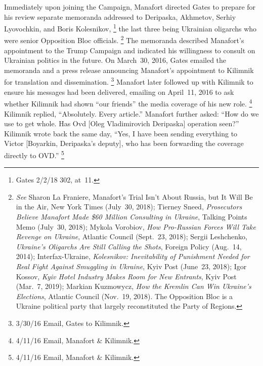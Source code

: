 Immediately upon joining the Campaign, Manafort directed Gates to prepare for his review separate memoranda addressed to Deripaska, Akhmetov, Serhiy Lyovochkin, and Boris Kolesnikov,%
\footnote{Gates 2/2/18 302, at~11.}
the last three being Ukrainian oligarchs who were senior Opposition Bloc officials.%
\footnote{\textit{See} Sharon La Franiere, Manafort's Trial Isn't About Russia, but It Will Be in the Air, New York Times (July~30, 2018);
Tierney Sneed, \textit{Prosecutors Believe Manafort Made \$60 Million Consulting in Ukraine}, Talking Points Memo (July~30, 2018);
Mykola Vorobiov, \textit{How Pro-Russian Forces Will Take Revenge on Ukraine}, Atlantic Council (Sept.~23, 2018);
Sergii Leshchenko, \textit{Ukraine's Oligarchs Are Still Calling the Shots}, Foreign Policy (Aug.~14, 2014);
Interfax-Ukraine, \textit{Kolesnikov: Inevitability of Punishment Needed for Real Fight Against Smuggling in Ukraine}, Kyiv Post (June~23, 2018);
Igor Kossov, \textit{Kyiv Hotel Industry Makes Room for New Entrants}, Kyiv Post (Mar.~7, 2019);
Markian Kuzmowycz, \textit{How the Kremlin Can Win Ukraine's Elections}, Atlantic Council (Nov.~19, 2018).
The Opposition Bloc is a Ukraine political party that largely reconstituted the Party of Regions.
}
The memoranda described Manafort's appointment to the Trump Campaign and indicated his willingness to consult on Ukrainian politics in the future.
On March~30, 2016, Gates emailed the memoranda and a press release announcing Manafort's appointment to Kilimnik for translation and dissemination.%
\footnote{3/30/16 Email, Gates to Kilimnik.}
Manafort later followed up with Kilimnik to ensure his messages had been delivered, emailing on April~11, 2016 to ask whether Kilimnik had shown ``our friends'' the media coverage of his new role.%
\footnote{4/11/16 Email, Manafort \& Kilimnik.}
Kilimnik replied, ``Absolutely.
Every article.''
Manafort further asked: ``How do we use to get whole.
Has Ovd [Oleg Vladimirovich Deripaska] operation seen?''
Kilimnik wrote back the same day, ``Yes, I have been sending everything to Victor [Boyarkin, Deripaska's deputy], who has been forwarding the coverage directly to OVD.''%
\footnote{4/11/16 Email, Manafort \& Kilimnik.}

